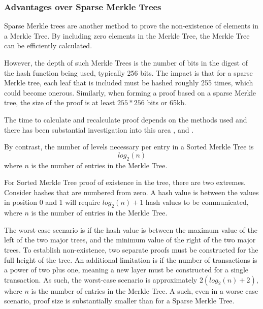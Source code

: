 \documentclass[a4paper,12pt]{article}
\newcommand{\concatenate}{\mathbin{\|}}
\begin{document}
\subsubsection{Advantages over Sparse Merkle Trees}
Sparse Merkle trees are another method to prove the non-existence of elements in a Merkle Tree. By including zero elements in the Merkle Tree, the Merkle Tree can be efficiently calculated.

However, the depth of such Merkle Trees is the number of bits in the digest of the hash function being used, typically 256 bits. The impact is that for a sparse Merkle tree, each leaf that is included must be hashed roughly 255 times, which could become onerous. Similarly, when forming a proof based on a sparse Merkle tree, the size of the proof is at least $255 * 256$ bits or 65kb.

The time to calculate and recalculate proof depends on the methods used and there has been substantial investigation into this area \cite{sparseMerkleTrees1}, \cite{sparseMerkleTrees2} and \cite{sparseMerkleTrees3}.


By contrast, the number of levels necessary per entry in a Sorted Merkle Tree is
\[log_2(n)\] 
where $n$ is the number of entries in the Merkle Tree.

For Sorted Merkle Tree proof of existence in the tree, there are two extremes. Consider hashes that are numbered from zero. A hash value is between the values in position 0 and 1 will require $log_2(n)+1$ hash values to be communicated, where $n$ is the number of entries in the Merkle Tree.



The worst-case scenario is if the hash value is between the maximum value of the left of the two major trees, and the minimum value of the right of the two major trees. To establish non-existence, two separate proofs must be constructed for the full height of the tree. An additional limitation is if the number of transactions is a power of two plus one, meaning a new layer must be constructed for a single transaction. As such, the worst-case scenario is approximately $2(log_2(n)+2)$, where $n$ is the number of entries in the Merkle Tree. A such, even in a worse case scenario, proof size is substantially smaller than for a Sparse Merkle Tree. 
\end{document}
